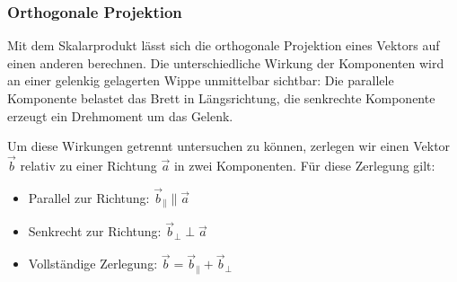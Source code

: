\subsubsection{Orthogonale Projektion}
\label{subsubsec:vector_algebra_orthogonal_projection}

Mit dem Skalarprodukt lässt sich die orthogonale Projektion
 eines Vektors auf einen anderen
berechnen. Die unterschiedliche Wirkung der Komponenten wird an einer
gelenkig gelagerten Wippe unmittelbar sichtbar: Die parallele Komponente
 belastet das Brett in Längsrichtung, die
senkrechte Komponente  erzeugt ein
Drehmoment um das Gelenk.

\begin{center}
\end{center}

Um diese Wirkungen getrennt untersuchen zu können, zerlegen wir einen Vektor
$\vec b$ relativ zu einer Richtung $\vec a$ in zwei Komponenten. Für diese Zerlegung gilt:
\par\medskip
\noindent
\begin{minipage}[c]{0.45\linewidth}
  \begin{itemize}[leftmargin=1.4em,itemsep=0.8em]
    \item Parallel zur Richtung:\quad
      $\vec b_{\parallel}\parallel\vec a$
    \item Senkrecht zur Richtung:\quad
      $\vec b_{\perp}\perp\vec a$
    \item Vollständige Zerlegung:\quad
      $\vec b=\vec b_{\parallel}+\vec b_{\perp}$
  \end{itemize}
\end{minipage}\hfill
\begin{minipage}[c]{0.52\linewidth}
  \centering
\end{minipage}
\par\medskip


